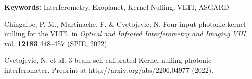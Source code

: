 \documentclass[12pt]{article}
\begin{document}
\textbf{\large Keywords:} Interferometry, Exoplanet, Kernel-Nulling, VLTI, ASGARD 

\begin{thebibliography}{60}

 Chingaipe, P. M., Martinache, F. \& Cvetojevic, N. Four-input photonic kernel-nulling for the VLTI. in {\it Optical and Infrared Interferometry and Imaging VIII} vol. \textbf{12183} 448–457 (SPIE, 2022).

 Cvetojevic, N. et al. 3-beam self-calibrated Kernel nulling photonic interferometer. Preprint at http://arxiv.org/abs/2206.04977 (2022).

\end{thebibliography}
\end{document}

